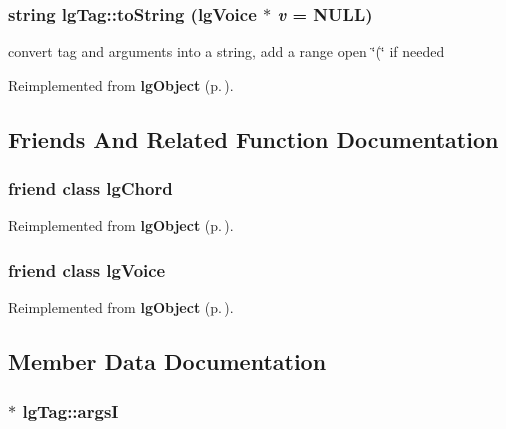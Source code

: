 \subsubsection{\setlength{\rightskip}{0pt plus 5cm}string lg\-Tag::to\-String ({\bf lg\-Voice} $\ast$ {\em v} = NULL)\hspace{0.3cm}{\tt  [virtual]}}\label{classlgTag_a5}


convert tag and arguments into a string, add a range open \char`\"{}(\char`\"{} if needed 



Reimplemented from {\bf lg\-Object} {\rm (p.\,\pageref{classlgObject_a3})}.

\subsection{Friends And Related Function Documentation}
\subsubsection{\setlength{\rightskip}{0pt plus 5cm}friend class {\bf lg\-Chord}\hspace{0.3cm}{\tt  [friend]}}\label{classlgTag_n0}




Reimplemented from {\bf lg\-Object} {\rm (p.\,\pageref{classlgObject_n5})}.
\subsubsection{\setlength{\rightskip}{0pt plus 5cm}friend class {\bf lg\-Voice}\hspace{0.3cm}{\tt  [friend]}}\label{classlgTag_n1}




Reimplemented from {\bf lg\-Object} {\rm (p.\,\pageref{classlgObject_n1})}.

\subsection{Member Data Documentation}
\subsubsection{$\ast$ {\bf lg\-Tag::args\-I}\hspace{0.3cm}{\tt  [private]}}\label{classlgTag_r2}


